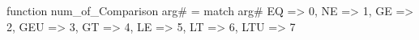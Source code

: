 function num_of_Comparison arg# = match arg# {
  EQ => 0,
  NE => 1,
  GE => 2,
  GEU => 3,
  GT => 4,
  LE => 5,
  LT => 6,
  LTU => 7
}
